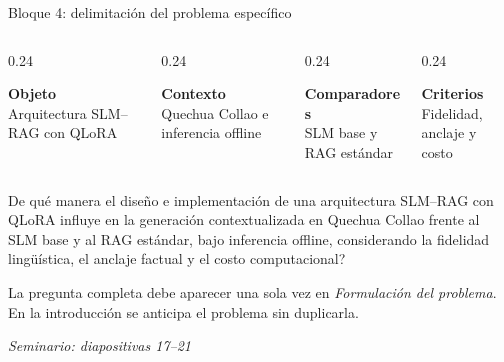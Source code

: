 \documentclass[aspectratio=169,10pt,spanish]{beamer}
\newcommand{\fuente}[1]{\vspace{0.05cm}\hfill{\color{bpNavy!65}\tiny\textit{Seminario: diapositivas #1}}}
\begin{document}
\begin{frame}{Bloque 4: delimitación del problema específico}
    \begin{columns}[T,onlytextwidth]
        \begin{column}{0.24\textwidth}
            \begin{tcolorbox}[height=1.45cm,colback=bpBlue!7,colframe=bpBlue]
                \centering\scriptsize\textbf{\color{bpBlue}Objeto}\\
                Arquitectura SLM--RAG con QLoRA
            \end{tcolorbox}
        \end{column}
        \begin{column}{0.24\textwidth}
            \begin{tcolorbox}[height=1.45cm,colback=bpRust!7,colframe=bpRust]
                \centering\scriptsize\textbf{\color{bpRust}Contexto}\\
                Quechua Collao e inferencia offline
            \end{tcolorbox}
        \end{column}
        \begin{column}{0.24\textwidth}
            \begin{tcolorbox}[height=1.45cm,colback=bpGold!10,colframe=bpGold!90!black]
                \centering\scriptsize\textbf{\color{bpGold!80!black}Comparadores}\\
                SLM base y RAG estándar
            \end{tcolorbox}
        \end{column}
        \begin{column}{0.24\textwidth}
            \begin{tcolorbox}[height=1.45cm,colback=bpGreen!7,colframe=bpGreen]
                \centering\scriptsize\textbf{\color{bpGreen}Criterios}\\
                Fidelidad, anclaje y costo
            \end{tcolorbox}
        \end{column}
    \end{columns}
    \vspace{0.15cm}
    \begin{tcolorbox}[enhanced,colback=white,colframe=bpNavy,title=\textbf{Pregunta de trabajo propuesta},arc=1.5mm]
        \small\centering
        \textquestiondown De qué manera el diseño e implementación de una arquitectura SLM--RAG con QLoRA
        influye en la generación contextualizada en Quechua Collao frente al SLM base y al
        RAG estándar, bajo inferencia offline, considerando la fidelidad lingüística,
        el anclaje factual y el costo computacional?
    \end{tcolorbox}
    \begin{tcolorbox}[colback=bpLightGray,colframe=bpGridLine,arc=1mm,top=1mm,bottom=1mm]
        \centering\tiny
        La pregunta completa debe aparecer una sola vez en \textit{Formulación del problema}.
        En la introducción se anticipa el problema sin duplicarla.
    \end{tcolorbox}
    \fuente{17--21}
\end{frame}
\end{document}
